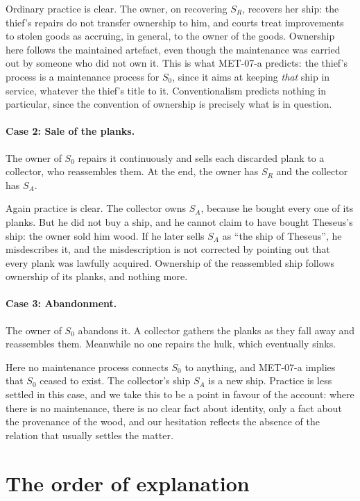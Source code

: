 \documentclass{situationist-preprint}
\begin{document}
Ordinary practice is clear. The owner, on recovering $S_R$, recovers her ship: the thief's repairs do not transfer ownership to him, and courts treat improvements to stolen goods as accruing, in general, to the owner of the goods. Ownership here follows the maintained artefact, even though the maintenance was carried out by someone who did not own it. This is what MET-07-a predicts: the thief's process is a maintenance process for $S_0$, since it aims at keeping \emph{that} ship in service, whatever the thief's title to it. Conventionalism predicts nothing in particular, since the convention of ownership is precisely what is in question.

\paragraph{Case 2: Sale of the planks.} The owner of $S_0$ repairs it continuously and sells each discarded plank to a collector, who reassembles them. At the end, the owner has $S_R$ and the collector has $S_A$.

Again practice is clear. The collector owns $S_A$, because he bought every one of its planks. But he did not buy a ship, and he cannot claim to have bought Theseus's ship: the owner sold him wood. If he later sells $S_A$ as \enquote{the ship of Theseus}, he misdescribes it, and the misdescription is not corrected by pointing out that every plank was lawfully acquired. Ownership of the reassembled ship follows ownership of its planks, and nothing more.

\paragraph{Case 3: Abandonment.} The owner of $S_0$ abandons it. A collector gathers the planks as they fall away and reassembles them. Meanwhile no one repairs the hulk, which eventually sinks.

Here no maintenance process connects $S_0$ to anything, and MET-07-a implies that $S_0$ ceased to exist. The collector's ship $S_A$ is a new ship. Practice is less settled in this case, and we take this to be a point in favour of the account: where there is no maintenance, there is no clear fact about identity, only a fact about the provenance of the wood, and our hesitation reflects the absence of the relation that usually settles the matter.

\section{The order of explanation}
\end{document}
